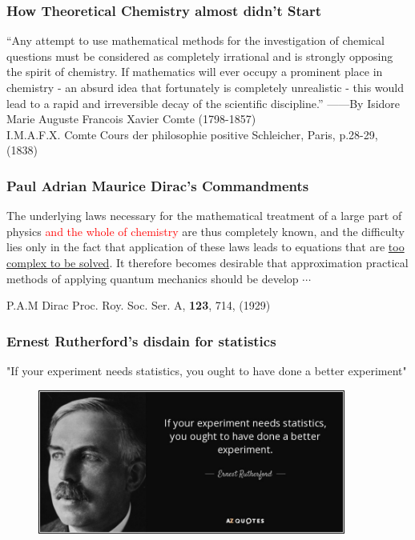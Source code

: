 \documentclass[cjk,slidestop,handout,compress,mathserif,blue]{beamer}	%
\begin{document}
\frame
{
	\frametitle{\textrm{How Theoretical Chemistry almost didn't Start}}
\textrm{``Any attempt to use mathematical methods for the investigation of chemical questions must be considered as completely irrational and is strongly opposing the spirit of chemistry. If mathematics will ever occupy a prominent place in chemistry - an absurd idea that fortunately is completely unrealistic - this would lead to a rapid and irreversible decay of the scientific discipline.'' 
\vskip 15pt
	------By Isidore Marie Auguste Francois Xavier Comte (1798-1857)\\
	I.M.A.F.X. Comte Cours der philosophie positive Schleicher, Paris, p.28-29, (1838)
}
}

\frame
{
	\frametitle{\textrm{Paul Adrian Maurice Dirac's Commandments}}
	\textrm{The underlying laws necessary for the mathematical treatment of a large part of physics \textcolor{red}{and the whole of chemistry} are thus completely known, and the difficulty lies only in the fact that application of these laws leads to equations that are \underline{too complex to be solved}.
\vskip 15pt
It therefore becomes desirable that approximation practical methods of applying quantum mechanics should be develop $\cdots$ 
}

\vskip 15pt
\textrm{P.A.M Dirac Proc. Roy. Soc. Ser. A, \textbf{123}, 714, (1929)}
}

\frame
{
	\frametitle{\textrm{Ernest Rutherford's disdain for statistics}}
	\textrm{"If your experiment needs statistics, you ought to have done a better experiment"}
\begin{figure}[h!]
\centering
\vspace{-10.5pt}
\includegraphics[height=0.46\textwidth,width=0.9\textwidth,viewport=0 0 850 420,clip]{Figures/Ernest_Rutherford-quote.jpg}
\label{Rutherford_Disdain}
\end{figure}
}
\end{document}
